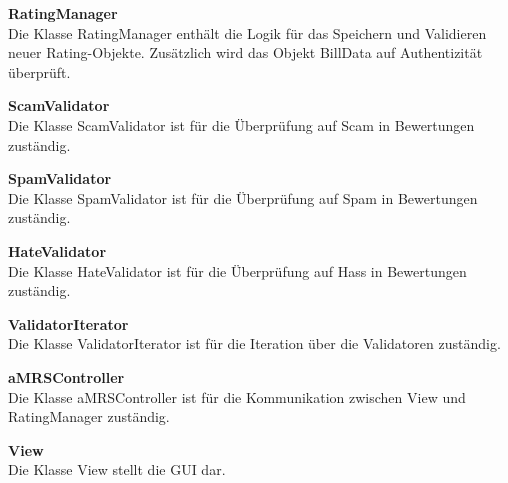 \noindent \textbf{RatingManager}\\
Die Klasse RatingManager enthält die Logik für das Speichern und Validieren neuer Rating-Objekte. Zusätzlich wird das
Objekt BillData auf Authentizität überprüft.
\newline

\noindent \textbf{ScamValidator}\\
Die Klasse ScamValidator ist für die Überprüfung auf Scam in Bewertungen zuständig.
\newline

\noindent \textbf{SpamValidator}\\
Die Klasse SpamValidator ist für die Überprüfung auf Spam in Bewertungen zuständig.
\newline

\noindent \textbf{HateValidator}\\
Die Klasse HateValidator ist für die Überprüfung auf Hass in Bewertungen zuständig.
\newline

\noindent \textbf{ValidatorIterator}\\
Die Klasse ValidatorIterator ist für die Iteration über die Validatoren zuständig.
\newline

\noindent \textbf{aMRSController}\\
Die Klasse aMRSController ist für die Kommunikation zwischen View und RatingManager zuständig.
\newline

\noindent \textbf{View}\\
Die Klasse View stellt die GUI dar.